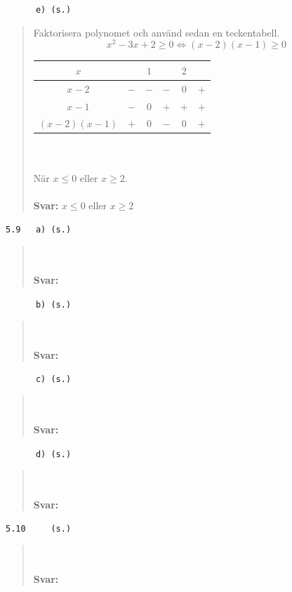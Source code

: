 \documentclass[a4paper]{article}
\newcommand{\tskcol}[1]{\textcolor{tskcol}{#1}}
\begin{document}
	\texttt{\tskcol{~~~~~~e) (s.)}}
	\begin{quotation}
		\noindent
		Faktorisera polynomet och använd sedan en teckentabell.
		\[x^2-3x+2 \ge 0 \Leftrightarrow
		(x-2)(x-1) \ge 0\]
		\begin{tabular}{c|c|c|c|c|c}
			$x$                     &     & $1$ &     & $2$ &     \\ \hline
			$x-2$                   & $-$ & $-$ & $-$ & $0$ & $+$ \\
			$x-1$                   & $-$ & $0$ & $+$ & $+$ & $+$ \\ \hline
			$(x-2)(x-1)$  			& $+$ & $0$ & $-$ & $0$ & $+$ \\
		\end{tabular} \\ \\
		När $x \le 0$ eller $x \ge 2$.
		\\ \\
		\textbf{Svar:} $x \le 0$ eller $x \ge 2$
	\end{quotation}
	
	\texttt{\tskcol{5.9~~~a) (s.)}}
	\begin{quotation}
		\noindent
		\\ \\
		\textbf{Svar:}
	\end{quotation}
	
	\texttt{\tskcol{~~~~~~b) (s.)}}
	\begin{quotation}
		\noindent
		\\ \\
		\textbf{Svar:}
	\end{quotation}
	
	\texttt{\tskcol{~~~~~~c) (s.)}}
	\begin{quotation}
		\noindent
		\\ \\
		\textbf{Svar:}
	\end{quotation}
	
	\texttt{\tskcol{~~~~~~d) (s.)}}
	\begin{quotation}
		\noindent
		\\ \\
		\textbf{Svar:}
	\end{quotation}
	
	\texttt{\tskcol{5.10~~~~ (s.)}}
	\begin{quotation}
		\noindent
		\\ \\
		\textbf{Svar:}
	\end{quotation}
	
\end{document}
